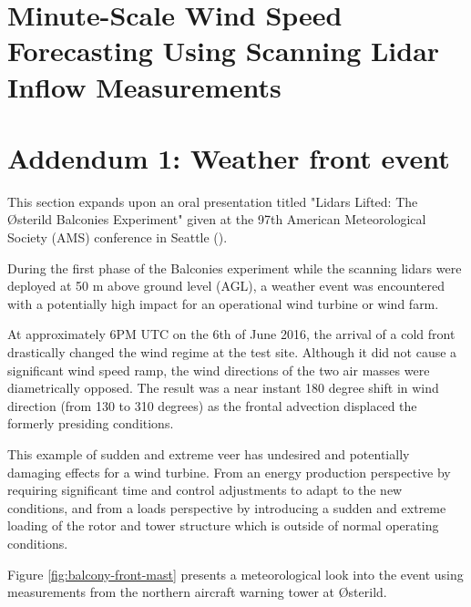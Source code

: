 \clearpage
\section{Minute-Scale Wind Speed Forecasting Using Scanning Lidar Inflow Measurements}
\label{sec:balcony_paper}



\clearpage
\section{Addendum 1: Weather front event}
\label{sec:balcony_addendum1}

This section expands upon an oral presentation titled "Lidars Lifted: The {\O}sterild Balconies Experiment" given at the 97th American Meteorological Society (AMS) conference in Seattle (\cite{simon_lidars_lifted_2017}).

During the first phase of the Balconies experiment while the scanning lidars were deployed at 50 m above ground level (AGL),
a weather event was encountered with a potentially high impact for an operational wind turbine or wind farm.

At approximately 6PM UTC on the 6th of June 2016, the arrival of a cold front drastically changed the wind regime at the test site. Although it did not cause a significant wind speed ramp, the wind directions of the two air masses were diametrically opposed. The result was a near instant 180 degree shift in wind direction (from 130 to 310 degrees) as the frontal advection displaced the formerly presiding conditions. 

This example of sudden and extreme veer has undesired and potentially damaging effects for a wind turbine. From an energy production perspective by requiring significant time and control adjustments to adapt to the new conditions, and from a loads perspective by introducing a sudden and extreme loading of the rotor and tower structure which is outside of normal operating conditions.

Figure \ref{fig:balcony-front-mast} presents a meteorological look into the event using measurements from the northern aircraft warning tower at {\O}sterild.

